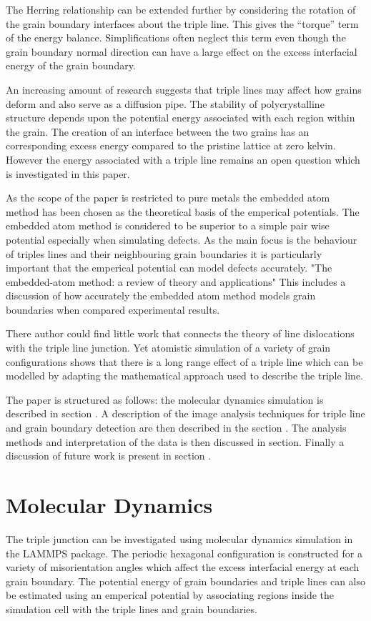 \documentclass[12pt,a4paper]{book}
\begin{document}
The Herring relationship can be extended further by considering the rotation of the grain boundary interfaces about the triple line. This gives the ``torque'' term of the energy balance. Simplifications often neglect this term even though the grain boundary normal direction can have a large effect on the excess interfacial energy of the grain boundary.

An increasing amount of research suggests that triple lines may affect how  grains deform and also serve as a diffusion pipe. The stability of polycrystalline structure depends upon the potential energy associated with each region within the grain. The creation of an interface between the two grains has an corresponding excess energy compared to the pristine lattice at zero kelvin. However the energy associated with a triple line remains an open question which is investigated in this paper.

As the scope of the paper is restricted to pure metals the embedded atom method has been chosen as the theoretical basis of the emperical potentials. The embedded atom method is considered to be superior to a simple pair wise potential especially when simulating defects. As the main focus is the behaviour of triples lines and their neighbouring grain boundaries it is particularly important that the emperical potential can model defects accurately. "The embedded-atom method:
a review of theory and applications" This includes a discussion of how accurately the embedded atom method models grain boundaries when compared  experimental results.

There author could find little work that connects the theory of line dislocations with the triple line junction. Yet atomistic simulation of a variety of grain configurations shows that there is a long range effect of a triple line which can be modelled by adapting the mathematical approach used to describe the triple line.  

The paper is structured as follows: the molecular dynamics simulation is described in section . A description of the image analysis techniques for triple line and grain boundary detection are then described in the section . The analysis methods and interpretation of the data is then discussed in section. Finally a  discussion of future work is present in section .

 


\chapter{Molecular Dynamics}
The triple junction can be investigated using molecular dynamics simulation in the LAMMPS package. The periodic hexagonal configuration is constructed for a variety of misorientation angles which affect the excess interfacial energy at each grain boundary. The potential energy of grain boundaries and triple lines can also be estimated using an emperical potential by associating regions inside the simulation cell with the triple lines and grain boundaries.
\end{document}
